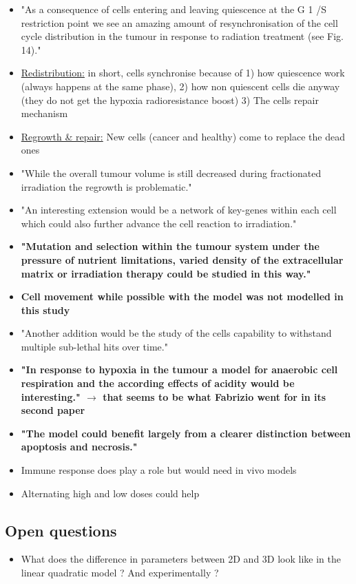 \documentclass[11pt,a4paper]{article}
\begin{document}
\begin{itemize}
\item "As a consequence of cells entering and leaving quiescence at the G 1 /S restriction point we see an amazing amount of resynchronisation of the cell cycle distribution in the tumour in response to radiation treatment (see Fig. 14)."
\item \underline{Redistribution:} in short, cells synchronise because of 1) how quiescence work (always happens at the same phase), 2) how non quiescent cells die anyway (they do not get the hypoxia radioresistance boost) 3) The cells repair mechanism
\item  \underline{Regrowth \& repair:} New cells (cancer and healthy) come to replace the dead ones
\item "While the overall tumour volume is still decreased during fractionated irradiation the regrowth is problematic."
\item "An interesting extension would be a network of key-genes within each cell which could also further advance the cell reaction to irradiation."
\item \textbf{"Mutation and selection within the tumour system under the pressure of nutrient limitations, varied density of the extracellular matrix or irradiation therapy could be studied in this way."}
\item \textbf{Cell movement while possible with the model was not modelled in this study}
\item "Another addition would be the study of the cells capability to withstand multiple sub-lethal hits over time."
\item \textbf{"In response to hypoxia in the tumour a model for anaerobic cell respiration and the according effects of acidity would be interesting." $\rightarrow$ that seems to be what Fabrizio went for in its second paper}
\item \textbf{"The model could benefit largely from a clearer distinction between apoptosis and necrosis."}
\item Immune response does play a role but would need in vivo models
\item Alternating high and low doses could help
\end{itemize}

\subsection*{Open questions}
\begin{itemize}
\item What does the difference in parameters between 2D and 3D look like in the linear quadratic model ? And experimentally ?
\end{itemize}
\end{document}
